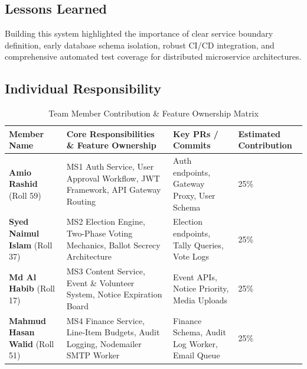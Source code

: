 \documentclass[12pt, a4paper]{article}
\begin{document}
\subsection{Lessons Learned}
Building this system highlighted the importance of clear service boundary definition, early database schema isolation, robust CI/CD integration, and comprehensive automated test coverage for distributed microservice architectures.

\subsection{Individual Responsibility}

\begin{table}[h!]
\centering
\caption{Team Member Contribution \& Feature Ownership Matrix}
\renewcommand{\arraystretch}{1.4}
\begin{tabular}{|p{3.8cm}|p{5.5cm}|p{3.2cm}|p{2.2cm}|}
\hline
\rowcolor{primaryblue} \color{white}\textbf{Member Name} & \color{white}\textbf{Core Responsibilities \& Feature Ownership} & \color{white}\textbf{Key PRs / Commits} & \color{white}\textbf{Estimated Contribution} \\ \hline
\textbf{Amio Rashid} (Roll 59) & MS1 Auth Service, User Approval Workflow, JWT Framework, API Gateway Routing & Auth endpoints, Gateway Proxy, User Schema & 25\% \\ \hline
\textbf{Syed Naimul Islam} (Roll 37) & MS2 Election Engine, Two-Phase Voting Mechanics, Ballot Secrecy Architecture & Election endpoints, Tally Queries, Vote Logs & 25\% \\ \hline
\textbf{Md Al Habib} (Roll 17) & MS3 Content Service, Event \& Volunteer System, Notice Expiration Board & Event APIs, Notice Priority, Media Uploads & 25\% \\ \hline
\textbf{Mahmud Hasan Walid} (Roll 51) & MS4 Finance Service, Line-Item Budgets, Audit Logging, Nodemailer SMTP Worker & Finance Schema, Audit Log Worker, Email Queue & 25\% \\ \hline
\end{tabular}
\end{table}
\end{document}
